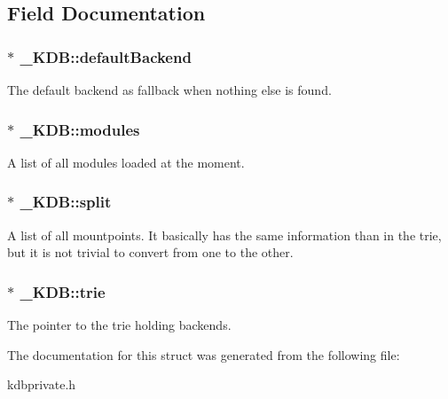 \subsection{Field Documentation}
\hypertarget{struct__KDB_a93951ad0fd6e131da9bb1035d5a69c13}{
\subsubsection[{defaultBackend}]{$\ast$ {\bf \_\-KDB::defaultBackend}}}
\label{struct__KDB_a93951ad0fd6e131da9bb1035d5a69c13}
The default backend as fallback when nothing else is found. \hypertarget{struct__KDB_a1ecf6a6a2a46222f243bbfc4c97015c6}{
\subsubsection[{modules}]{$\ast$ {\bf \_\-KDB::modules}}}
\label{struct__KDB_a1ecf6a6a2a46222f243bbfc4c97015c6}
A list of all modules loaded at the moment. \hypertarget{struct__KDB_ae301239675a86338980067c82c5134a9}{
\subsubsection[{split}]{$\ast$ {\bf \_\-KDB::split}}}
\label{struct__KDB_ae301239675a86338980067c82c5134a9}
A list of all mountpoints. It basically has the same information than in the trie, but it is not trivial to convert from one to the other. \hypertarget{struct__KDB_afbad422f11b1a72aaf6dc8909d60da17}{
\subsubsection[{trie}]{$\ast$ {\bf \_\-KDB::trie}}}
\label{struct__KDB_afbad422f11b1a72aaf6dc8909d60da17}
The pointer to the trie holding backends. 

The documentation for this struct was generated from the following file:\begin{DoxyCompactItemize}
\item 
kdbprivate.h\end{DoxyCompactItemize}
